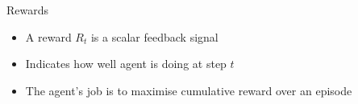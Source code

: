 \bgroup
\begin{frame}{Rewards}
\begin{itemize}
\item A \textcolor{mImagelabRed}{reward} $R_t$ is a scalar feedback signal
\item Indicates how well agent is doing at step $t$
\item The agent's job is to maximise cumulative reward over an episode
\end{itemize}
\end{frame}
\egroup